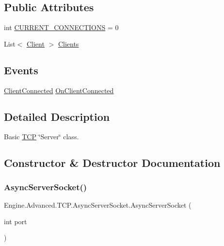 \subsection*{Public Attributes}
\begin{DoxyCompactItemize}
\item 
int \mbox{\hyperlink{class_engine_1_1_advanced_1_1_t_c_p_1_1_async_server_socket_a6018856640fe917e6e5836bcb05eb70b}{C\+U\+R\+R\+E\+N\+T\+\_\+\+C\+O\+N\+N\+E\+C\+T\+I\+O\+NS}} = 0
\item 
List$<$ \mbox{\hyperlink{class_engine_1_1_advanced_1_1_t_c_p_1_1_async_server_socket_1_1_client}{Client}} $>$ \mbox{\hyperlink{class_engine_1_1_advanced_1_1_t_c_p_1_1_async_server_socket_ae5f3da273e94027a18d24f93ed66d749}{Clients}}
\end{DoxyCompactItemize}
\subsection*{Events}
\begin{DoxyCompactItemize}
\item 
\mbox{\hyperlink{class_engine_1_1_advanced_1_1_t_c_p_1_1_async_server_socket_a5ef0e8ba1403714516d655edff0c24d6}{Client\+Connected}} \mbox{\hyperlink{class_engine_1_1_advanced_1_1_t_c_p_1_1_async_server_socket_a4ecb7de8eaee268deadc0b2a921daa8d}{On\+Client\+Connected}}
\end{DoxyCompactItemize}


\subsection{Detailed Description}
Basic \mbox{\hyperlink{namespace_engine_1_1_advanced_1_1_t_c_p}{T\+CP}} \char`\"{}\+Server\char`\"{} class. 



\subsection{Constructor \& Destructor Documentation}
\mbox{\label{class_engine_1_1_advanced_1_1_t_c_p_1_1_async_server_socket_a9fe683c88657977ed3f83e97615fd4fe}} 
\subsubsection{\texorpdfstring{AsyncServerSocket()}{AsyncServerSocket()}}
{\footnotesize\ttfamily Engine.\+Advanced.\+T\+C\+P.\+Async\+Server\+Socket.\+Async\+Server\+Socket (\begin{DoxyParamCaption}\item[{int}]{port }\end{DoxyParamCaption})}



